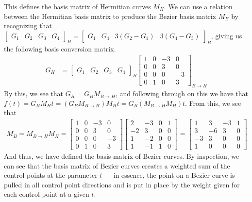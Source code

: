 \documentclass[11pt]{article}
\newcommand{\imp}{\rightarrow}
\begin{document}
This defines the basis matrix of Hermitian curves $M_H$. We can use a relation
between the Hermitian basis matrix to produce the Bezier basis matrix $M_B$ by
recognizing that $\begin{bmatrix}G_1 & G_2 & G_3 & G_4\end{bmatrix}_H =
\begin{bmatrix}G_1 & G_4 & 3(G_2 - G_1) & 3(G_4 - G_3)\end{bmatrix}_B$, giving
us the following basis conversion matrix.
\begin{align}
    G_H &= \begin{bmatrix}G_1 & G_2 & G_3 & G_4\end{bmatrix}_B
    \begin{bmatrix}
        1 & 0 & -3 &  0 \\
        0 & 0 &  3 &  0 \\
        0 & 0 &  0 & -3 \\
        0 & 1 &  0 &  3
    \end{bmatrix}_{B \imp H}
\end{align}
By this, we see that $G_H = G_B M_{B \imp H}$, and following through on this
we have that $f(t) = G_H M_H t = (G_B M_{B \imp H}) M_H t = G_B (M_{B \imp H}
M_H) t$. From this, we see that
\begin{align}
    M_B = M_{B \imp H} M_H =
    \begin{bmatrix}
        1 & 0 & -3 &  0 \\
        0 & 0 &  3 &  0 \\
        0 & 0 &  0 & -3 \\
        0 & 1 &  0 &  3
    \end{bmatrix}
    \begin{bmatrix}
         2 & -3 & 0 & 1 \\
        -2 &  3 & 0 & 0 \\
         1 & -2 & 0 & 0 \\
         1 & -1 & 1 & 0
    \end{bmatrix}
    =
    \begin{bmatrix}
         1 &  3 & -3 & 1 \\
         3 & -6 &  3 & 0 \\
        -3 &  3 &  0 & 0 \\
         1 &  0 &  0 & 0
    \end{bmatrix}
\end{align}
And thus, we have defined the basis matrix of Bezier curves. By inspection, we
can see that the basis matrix of Bezier curves creates a weighted sum of the
control points at the parameter $t$ --- in essence, the point on a Bezier
curve is pulled in all control point directions and is put in place by the
weight given for each control point at a given $t$.
\end{document}
